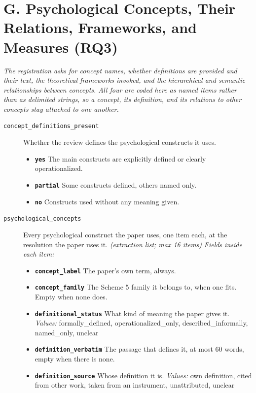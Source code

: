\documentclass[11pt]{article}
\begin{document}
\section*{G. Psychological Concepts, Their Relations, Frameworks, and Measures (RQ3)}
{\small\itshape The registration asks for concept names, whether definitions are provided and their text, the theoretical frameworks invoked, and the hierarchical and semantic relationships between concepts. All four are coded here as named items rather than as delimited strings, so a concept, its definition, and its relations to other concepts stay attached to one another.}\par\smallskip
\begin{description}
\item[\texttt{concept\_definitions\_present}] Whether the review defines the psychological constructs it uses.
  \begin{itemize}[leftmargin=1.3em,itemsep=2pt,topsep=2pt]
  \item \textbf{\texttt{yes}} The main constructs are explicitly defined or clearly operationalized.
  \item \textbf{\texttt{partial}} Some constructs defined, others named only.
  \item \textbf{\texttt{no}} Constructs used without any meaning given.
  \end{itemize}
\item[\texttt{psychological\_concepts}] Every psychological construct the paper uses, one item each, at the resolution the paper uses it. \textit{(extraction list; max 16 items)}
  {\small\itshape Fields inside each item:}
  \begin{itemize}[leftmargin=1.3em,itemsep=1pt,topsep=2pt]
  \item \textbf{\texttt{concept\_label}} The paper's own term, always.
  \item \textbf{\texttt{concept\_family}} The Scheme 5 family it belongs to, when one fits. Empty when none does.
  \item \textbf{\texttt{definitional\_status}} What kind of meaning the paper gives it. {\small \textit{Values:} formally\_defined, operationalized\_only, described\_informally, named\_only, unclear}
  \item \textbf{\texttt{definition\_verbatim}} The passage that defines it, at most 60 words, empty when there is none.
  \item \textbf{\texttt{definition\_source}} Whose definition it is. {\small \textit{Values:} own definition, cited from other work, taken from an instrument, unattributed, unclear}

\end{itemize}
\end{description}
\end{document}
